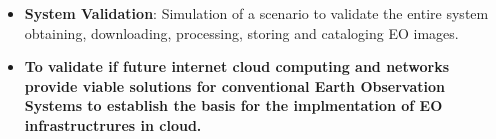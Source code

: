 \begin{itemize}
\item {\textbf{System Validation}: Simulation of a scenario to validate the
  entire system obtaining, downloading, processing, storing and cataloging
  \ac{EO} images. }

\item \textbf{To validate if future internet cloud computing
  and networks provide viable solutions for conventional Earth Observation
  Systems to establish the basis for the implmentation of EO infrastructrures in
  cloud.}

\end{itemize}

